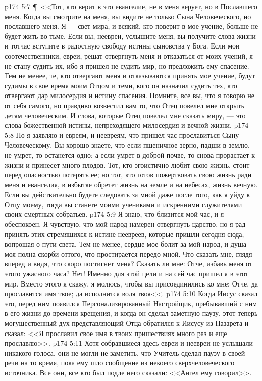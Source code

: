 \vs p174 5:7 \P\ <<Тот, кто верит в это евангелие, не в меня верует, но в Пославшего меня. Когда вы смотрите на меня, вы видите не только Сына Человеческого, но пославшего меня. Я --- свет мира, и всякий, кто поверит в мое учение, больше не будет жить во тьме. Если вы, неевреи, услышите меня, вы получите слова жизни и тотчас вступите в радостную свободу истины сыновства у Бога. Если мои соотечественники, евреи, решат отвергнуть меня и отказаться от моих учений, я не стану судить их, ибо я пришел не судить мир, но предложить ему спасение. Тем не менее, те, кто отвергают меня и отказываются принять мое учение, будут судимы в свое время моим Отцом и теми, кого он назначил судить тех, кто отвергают дар милосердия и истину спасения. Помните, все вы, что я говорю не от себя самого, но правдиво возвестил вам то, что Отец повелел мне открыть детям человеческим. И слова, которые Отец повелел мне сказать миру, --- это слова божественной истины, непреходящего милосердия и вечной жизни.
\vs p174 5:8 Но я заявляю и евреям, и неевреям, что пришел час прославиться Сыну Человеческому. Вы хорошо знаете, что если пшеничное зерно, падши в землю, не умрет, то останется одно; а если умрет в доброй почве, то снова прорастает к жизни и принесет много плодов. Тот, кто эгоистично любит свою жизнь, стоит перед опасностью потерять ее; но тот, кто готов пожертвовать свою жизнь ради меня и евангелия, в избытке обретет жизнь на земле и на небесах, жизнь вечную. Если вы действительно будете следовать за мной даже после того, как я уйду к Отцу моему, тогда вы станете моими учениками и искренними служителями своих смертных собратьев.
\vs p174 5:9 Я знаю, что близится мой час, и я обеспокоен. Я чувствую, что мой народ намерен отвергнуть царство, но я рад принять этих стремящихся к истине неевреев, которые пришли сегодня сюда, вопрошая о пути света. Тем не менее, сердце мое болит за мой народ, и душа моя полна скорби оттого, что простирается передо мной. Что сказать мне, глядя вперед и видя, что скоро постигнет меня? Сказать ли мне: Отче, избавь меня от этого ужасного часа? Нет! Именно для этой цели и на сей час пришел я в этот мир. Вместо этого я скажу, я молюсь, чтобы вы присоединились ко мне: Отче, да прославится имя твое; да исполнится воля твоя<<.
\vs p174 5:10 Когда Иисус сказал это, перед ним появился Персонализированный Настройщик, пребывавший с ним в его жизни до времени крещения, и когда он сделал заметную паузу, этот теперь могущественный дух представляющий Отца обратился к Иисусу из Назарета и сказал: <<Я прославил свое имя в твоих пришествиях много раз и еще прославлю>>.
\vs p174 5:11 Хотя собравшиеся здесь евреи и неевреи не услышали никакого голоса, они не могли не заметить, что Учитель сделал паузу в своей речи на то время, пока ему шло сообщение из некоего сверхчеловеческого источника. Все они, все кто был подле него сказали: <<Ангел ему говорил>>.
